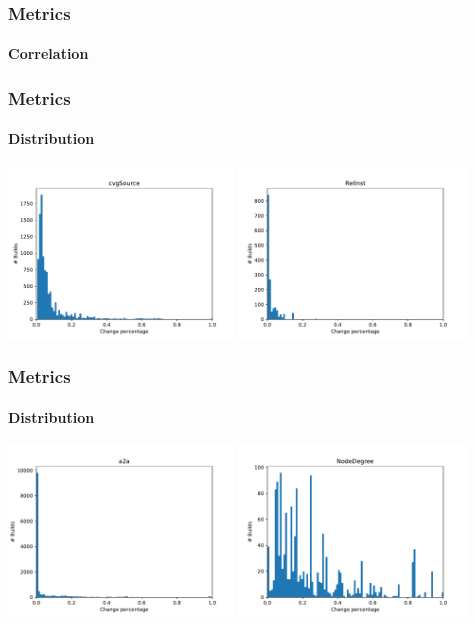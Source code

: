 \documentclass{beamer}
\begin{document}
\begin{frame}
	\frametitle{Metrics}
	\framesubtitle{Correlation}
	
	
\end{frame}

\begin{frame}
	\frametitle{Metrics}
	\framesubtitle{Distribution}
	
	\includegraphics[width=6cm]{assets/cvgSource.pdf}
	\includegraphics[width=6cm]{assets/RelInst.pdf}
	
\end{frame}

\begin{frame}
	\frametitle{Metrics}
	\framesubtitle{Distribution}
	
	\includegraphics[width=6cm]{assets/a2a.pdf}
	\includegraphics[width=6cm]{assets/NodeDegree.pdf}
	
\end{frame}
\end{document}
